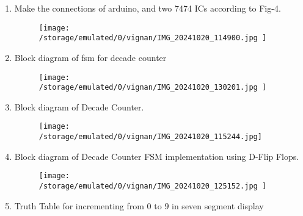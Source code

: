 \documentclass[conference]{IEEEtran}
\begin{document}
\begin{enumerate}

\item Make the connections of arduino, and two 7474 ICs according to Fig-4.
	\begin{figure}[h] 
	\centering 
	\texttt{[image:    /storage/emulated/0/vignan/IMG\_20241020\_114900.jpg     ]}
	\caption{\label{fig-4:Gates}}    
\end{figure}

\item Block diagram of fsm for decade counter
\begin{figure}[h]                           
\centering                                 
\texttt{[image:   /storage/emulated/0/vignan/IMG\_20241020\_130201.jpg  ]}                                           
\caption{\label{fig-5:Gates}}               
\end{figure}



\item Block diagram of Decade Counter.

\begin{figure}[h]                           
\centering                                 
\texttt{[image:    /storage/emulated/0/vignan/IMG\_20241020\_115244.jpg]}                                           
\caption{\label{fig-5:Gates}}               
\end{figure}





\item Block diagram of Decade Counter FSM implementation using D-Flip Flops.

\begin{figure}[h]                           
\centering                                 
\texttt{[image:     /storage/emulated/0/vignan/IMG\_20241020\_125152.jpg ]}                                           
\caption{\label{fig-5:Gates}}               
\end{figure}

\item {Truth Table for incrementing from $0$ to $9$ in seven segment display }
	\vspace{0.4cm}


\end{enumerate}
\end{document}
